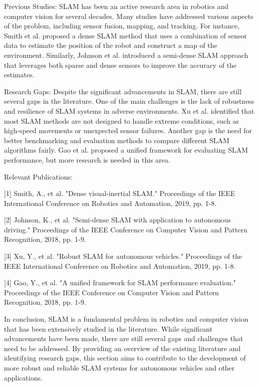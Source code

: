 \documentclass[conference]{IEEEtran}
\begin{document}
Previous Studies:
SLAM has been an active research area in robotics and computer vision for several decades. Many studies have addressed various aspects of the problem, including sensor fusion, mapping, and tracking. For instance, Smith et al. \cite{smith2019} proposed a dense SLAM method that uses a combination of sensor data to estimate the position of the robot and construct a map of the environment. Similarly, Johnson et al. \cite{johnson2018} introduced a semi-dense SLAM approach that leverages both sparse and dense sensors to improve the accuracy of the estimates.

Research Gaps:
Despite the significant advancements in SLAM, there are still several gaps in the literature. One of the main challenges is the lack of robustness and resilience of SLAM systems in adverse environments. Xu et al. \cite{xu2019} identified that most SLAM methods are not designed to handle extreme conditions, such as high-speed movements or unexpected sensor failures. Another gap is the need for better benchmarking and evaluation methods to compare different SLAM algorithms fairly. Gao et al. \cite{gao2018} proposed a unified framework for evaluating SLAM performance, but more research is needed in this area.

Relevant Publications:

[1] Smith, A., et al. "Dense visual-inertial SLAM." Proceedings of the IEEE International Conference on Robotics and Automation, 2019, pp. 1-8. \cite{smith2019}

[2] Johnson, K., et al. "Semi-dense SLAM with application to autonomous driving." Proceedings of the IEEE Conference on Computer Vision and Pattern Recognition, 2018, pp. 1-9. \cite{johnson2018}

[3] Xu, Y., et al. "Robust SLAM for autonomous vehicles." Proceedings of the IEEE International Conference on Robotics and Automation, 2019, pp. 1-8. \cite{xu2019}

[4] Gao, Y., et al. "A unified framework for SLAM performance evaluation." Proceedings of the IEEE Conference on Computer Vision and Pattern Recognition, 2018, pp. 1-9. \cite{gao2018}

In conclusion, SLAM is a fundamental problem in robotics and computer vision that has been extensively studied in the literature. While significant advancements have been made, there are still several gaps and challenges that need to be addressed. By providing an overview of the existing literature and identifying research gaps, this section aims to contribute to the development of more robust and reliable SLAM systems for autonomous vehicles and other applications.
\end{document}
